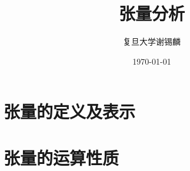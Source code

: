 \documentclass[oneside]{book}
\title{
	\vspace{-4 cm} \color{Sienna} \Huge 张量分析
}
\author{
	\CJKfamily{楷体} \color{DarkRed} \Large 复旦大学\phantom{空格}谢锡麟
}
\date{
	\CJKfamily{楷体} \color{Goldenrod} \Large \today
}
\theoremstyle{nonumberplain} %
\begin{document}
%	
%	
	\chapter{张量的定义及表示}
		
	
	\chapter{张量的运算性质}
		
%		
\end{document}
